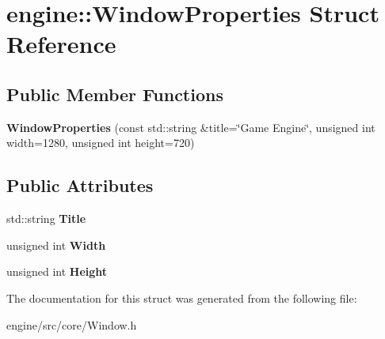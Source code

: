 \hypertarget{structengine_1_1WindowProperties}{}\section{engine\+:\+:Window\+Properties Struct Reference}
\label{structengine_1_1WindowProperties}
\subsection*{Public Member Functions}
\begin{DoxyCompactItemize}
\item
\mbox{\label{structengine_1_1WindowProperties_a8987e75ecc92e10f6764c0a677839b71}}
{\bfseries Window\+Properties} (const std\+::string \&title=\char`\"{}Game Engine\char`\"{}, unsigned int width=1280, unsigned int height=720)
\end{DoxyCompactItemize}
\subsection*{Public Attributes}
\begin{DoxyCompactItemize}
\item
\mbox{\label{structengine_1_1WindowProperties_a900cb8f590d355b520c7f8f4f75ecd99}}
std\+::string {\bfseries Title}
\item
\mbox{\label{structengine_1_1WindowProperties_a565d00a868bd2aae0abedb9e0f6faf9e}}
unsigned int {\bfseries Width}
\item
\mbox{\label{structengine_1_1WindowProperties_aa88ea216a94e459a14c5e8549c9630ba}}
unsigned int {\bfseries Height}
\end{DoxyCompactItemize}


The documentation for this struct was generated from the following file\+:\begin{DoxyCompactItemize}
\item
engine/src/core/Window.\+h\end{DoxyCompactItemize}
